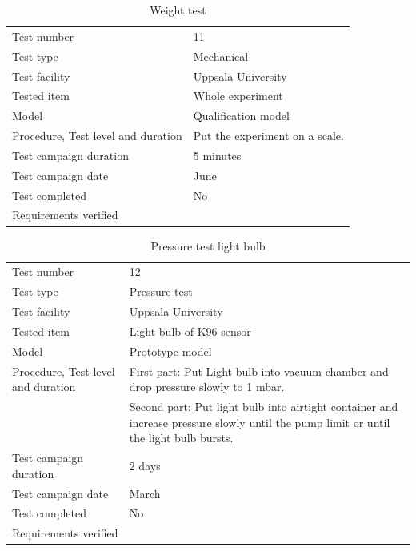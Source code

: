\documentclass[12pt,a4paper]{report}
\begin{document}
\begin{table}[H]
\centering
\caption{Weight test}
\label{tab:weight_test}
\begin{tabular}{L{5cm}L{10cm}}
\toprule
Test number & 11 \\
Test type & Mechanical \\
Test facility & Uppsala University \\
Tested item & Whole experiment \\
Model & Qualification model \\
Procedure, Test level and duration & Put the experiment on a scale. \\
Test campaign duration & 5 minutes \\
Test campaign date & June \\
Test completed & No \\
Requirements verified & \\
\bottomrule
\end{tabular}
\end{table}

\begin{table}[H]
\centering
\caption{Pressure test light bulb}
\label{tab:test_pressure_light_bulb}
\begin{tabular}{L{5cm}L{10cm}}
\toprule
Test number & 12 \\
Test type & Pressure test \\
Test facility & Uppsala University \\
Tested item & Light bulb of K96 sensor \\
Model & Prototype model \\
Procedure, Test level and duration & First part: Put Light bulb into vacuum chamber and drop pressure slowly to 1 mbar. \\
& Second part: Put light bulb into airtight container and increase pressure slowly until the pump limit or until the light bulb bursts. \\
Test campaign duration & 2 days \\
Test campaign date & March \\
Test completed & No \\
Requirements verified & \\
\bottomrule
\end{tabular}
\end{table}
\end{document}
